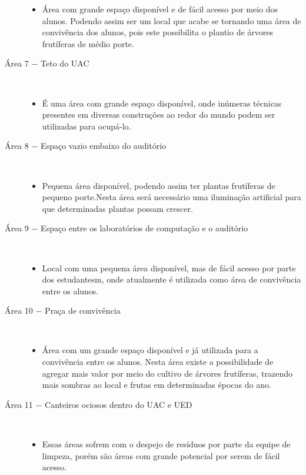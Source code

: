 \begin{description}
      \begin{itemize}
        \item Área com grande espaço disponível e de fácil acesso por meio dos alunos. Podendo assim ser um local que acabe se tornando uma área de
          convivência dos alunos, pois este possibilita o plantio de árvores frutíferas de médio porte.
      \end{itemize}
    \item[Área 7 $-$ Teto do UAC] \
      \begin{itemize}
        \item É uma área com grande espaço disponível, onde inúmeras técnicas presentes em diversas construções ao redor do mundo podem
          ser utilizadas para ocupá-lo.
      \end{itemize}
    \item[Área 8 $-$ Espaço vazio embaixo do auditório] \
      \begin{itemize}
        \item Pequena área disponível, podendo assim ter plantas frutíferas de pequeno porte.Nesta área será necessário uma
          iluminação artificial para que determinadas plantas possam crescer.
      \end{itemize}
    \item[Área 9 $-$ Espaço entre os laboratórios de computação e o auditório] \
      \begin{itemize}
        \item Local com uma pequena área disponível, mas de fácil acesso por parte dos estudantesm, onde atualmente é utilizada como área de
          convivência entre os alunos.
      \end{itemize}
    \item[Área 10 $-$ Praça de convivência] \
      \begin{itemize}
        \item Área com um grande espaço disponível e já utilizada para a convivência entre os alunos. Nesta área existe a possibilidade de
          agregar mais valor por meio do cultivo de árvores frutíferas, trazendo mais sombras ao local e frutas em determinadas épocas do
          ano.
      \end{itemize}
    \item[Área 11 $-$ Canteiros ociosos dentro do UAC e UED] \
      \begin{itemize}
        \item Essas áreas sofrem com o despejo de resíduos por parte da equipe de limpeza, porém são áreas com grande potencial por serem de
          fácil acesso.
      \end{itemize}
  \end{description}

